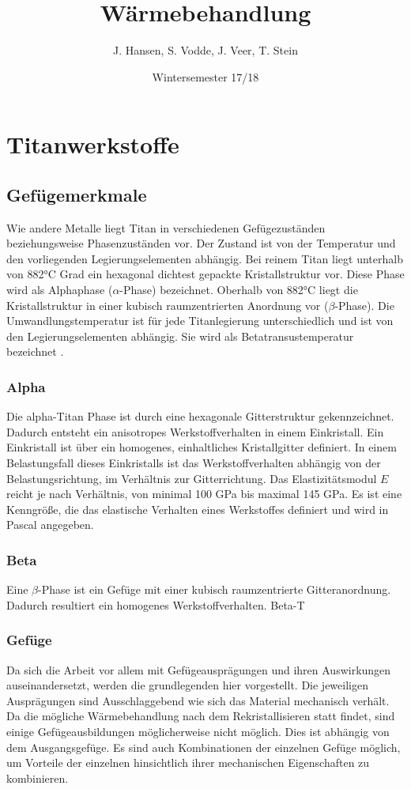 \documentclass[a4paper, 11pt]{tubsreprt}
\title{Wärmebehandlung}
\date{Wintersemester 17/18}
\author{J. Hansen, S. Vodde,
 J. Veer, T. Stein}
\begin{document}
\maketitle
\tableofcontents
\chapter{Titanwerkstoffe}
\section{Gefügemerkmale}
Wie andere Metalle liegt Titan in verschiedenen Gefügezuständen beziehungsweise Phasenzuständen vor. Der Zustand ist von der Temperatur und den vorliegenden Legierungselementen abhängig. Bei reinem Titan liegt unterhalb von 882°C Grad ein hexagonal dichtest gepackte Kristallstruktur vor. Diese Phase wird als Alphaphase ($\alpha$-Phase) bezeichnet. Oberhalb von 882°C liegt die Kristallstruktur in einer kubisch raumzentrierten Anordnung vor ($\beta$-Phase). Die Umwandlungstemperatur ist für jede Titanlegierung unterschiedlich und ist von den Legierungselementen abhängig. Sie wird als Betatransustemperatur bezeichnet \cite{Luetjering2007}.

\subsection{Alpha}
Die alpha-Titan Phase ist durch eine hexagonale Gitterstruktur gekennzeichnet. Dadurch entsteht ein anisotropes Werkstoffverhalten in einem Einkristall.
Ein Einkristall ist über ein homogenes, einhaltliches Kristallgitter definiert.
In einem Belastungsfall dieses Einkristalls ist das Werkstoffverhalten abhängig von der Belastungsrichtung, im Verhältnis zur Gitterrichtung. Das Elastizitätsmodul $E$ reicht je nach Verhältnis, von minimal 100 GPa bis maximal 145 GPa. Es ist eine Kenngröße, die das elastische Verhalten eines Werkstoffes definiert und wird in Pascal angegeben. 

\subsection{Beta}
Eine $\beta$-Phase ist ein Gefüge mit einer kubisch raumzentrierte Gitteranordnung. Dadurch resultiert ein homogenes Werkstoffverhalten.
Beta-T  
\subsection{Gefüge}
Da sich die Arbeit vor allem mit Gefügeausprägungen und ihren Auswirkungen auseinandersetzt, werden die grundlegenden hier vorgestellt. Die jeweiligen Ausprägungen sind Ausschlaggebend wie sich das Material mechanisch verhält. Da die mögliche Wärmebehandlung nach dem Rekristallisieren statt findet, sind einige Gefügeausbildungen möglicherweise nicht möglich. Dies ist abhängig von dem Ausgangsgefüge.
Es sind auch Kombinationen der einzelnen Gefüge möglich, um Vorteile der einzelnen hinsichtlich ihrer mechanischen Eigenschaften zu kombinieren.
\end{document}
